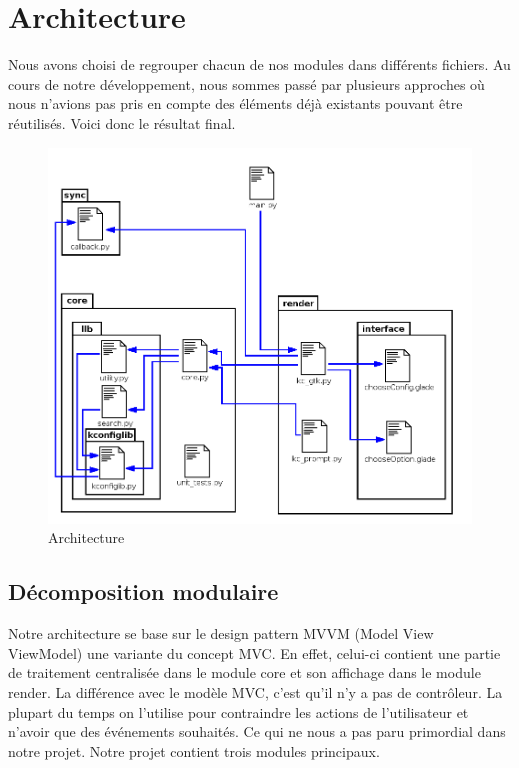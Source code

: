 \documentclass[16pts]{report}
\begin{document}

\nocite{*}

\chapter{Architecture}
\label{cha:Architecture}

Nous avons choisi de regrouper chacun de nos modules dans différents fichiers.
Au cours de notre développement, nous sommes passé par plusieurs approches
où nous n'avions pas pris en compte des éléments déjà existants pouvant être
réutilisés. Voici donc le résultat final.
\begin{figure}[H]
    \includegraphics[scale=0.5]{illustrations/archi_add_v1.png}
    \centering
    \caption{Architecture}
    \label{fig:Arch}
\end{figure}

\section{Décomposition modulaire}
\label{sec:Décomposition modulaire}
Notre architecture se base sur le design pattern MVVM (Model View
ViewModel) une variante du concept MVC. En effet, celui-ci contient une
partie de traitement centralisée dans le module core et son affichage dans
le module render.
La différence avec le modèle MVC, c'est qu'il n'y a pas de contrôleur.  La
plupart du temps on l'utilise pour contraindre les actions de l'utilisateur
et n'avoir que des événements souhaités. Ce qui ne nous a pas paru primordial
dans notre projet.
Notre projet contient trois modules principaux.
\end{document}
